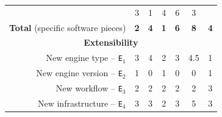 \documentclass[preprint,3p,twocolumn]{elsarticle}
\begin{document}
\begin{table}
\begin{tabular}{rcccccc}
                                     & \cellcolor[HTML]{99E399}3
                                     & \cellcolor[HTML]{99FF99}1
                                     & \cellcolor[HTML]{99D699}4
                                     & \cellcolor[HTML]{99BB99}6
                                     & \cellcolor[HTML]{99E399}3\\
  \textbf{Total} (specific software pieces)& \cellcolor[HTML]{99F599}\textbf{2}
                                     & \cellcolor[HTML]{99E199}\textbf{4}
                                     & \cellcolor[HTML]{99FF99}\textbf{1}
                                     & \cellcolor[HTML]{99CE99}\textbf{6}
                                     & \cellcolor[HTML]{99BB99}\textbf{8}
                                     & \cellcolor[HTML]{99E199}\textbf{4}\\
\multicolumn{7}{c}{\cellcolor[HTML]{EEEEEE}\textbf{Extensibility}}\\
  New engine type -- \texttt{E$_1$}  & \cellcolor[HTML]{99D899}3
                                     & \cellcolor[HTML]{99C499}4
                                     & \cellcolor[HTML]{99EB99}2
                                     & \cellcolor[HTML]{99D899}3
                                     & \cellcolor[HTML]{99BB99}4.5
                                     & \cellcolor[HTML]{99FF99}1\\
New engine version -- \texttt{E$_2$} & \cellcolor[HTML]{99BB99}1
                                     & \cellcolor[HTML]{99FF99}0
                                     & \cellcolor[HTML]{99BB99}1
                                     & \cellcolor[HTML]{99FF99}0
                                     & \cellcolor[HTML]{99FF99}0
                                     & \cellcolor[HTML]{99BB99}1\\
  New workflow -- \texttt{E$_3$} & \cellcolor[HTML]{99FF99}2
                                     & \cellcolor[HTML]{99FF99}2
                                     & \cellcolor[HTML]{99FF99}2
                                     & \cellcolor[HTML]{99FF99}2
                                     & \cellcolor[HTML]{99FF99}2
                                     & \cellcolor[HTML]{99BB99}3\\
New infrastructure -- \texttt{E$_4$} & \cellcolor[HTML]{99E899}3
                                     & \cellcolor[HTML]{99E899}3
                                     & \cellcolor[HTML]{99FF99}2
                                     & \cellcolor[HTML]{99E899}3
                                     & \cellcolor[HTML]{99BB99}5
                                     & \cellcolor[HTML]{99E899}3\\

\end{tabular}
\end{table}
\end{document}
